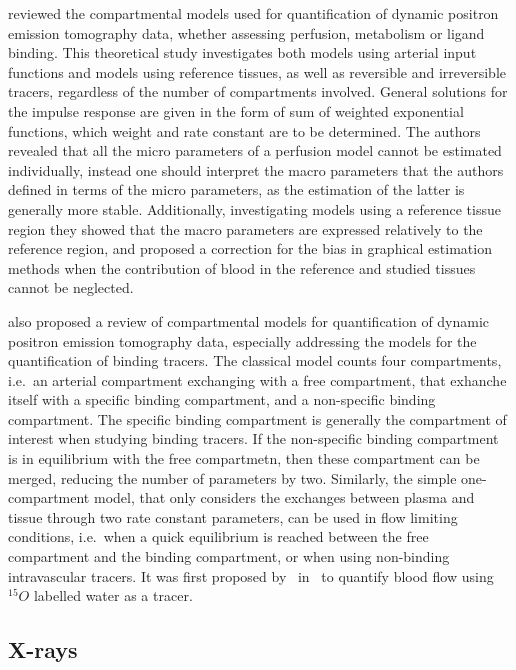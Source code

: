 \citet{Gunn:2001cx} reviewed the compartmental models used for quantification of dynamic positron emission tomography data, whether assessing perfusion, metabolism or ligand binding.
This theoretical study investigates both models using arterial input functions and models using reference tissues, as well as reversible and irreversible tracers, regardless of the number of compartments involved. 
General solutions for the impulse response are given in the form of sum of weighted exponential functions, which weight and rate constant are to be determined.
The authors revealed that all the micro parameters of a perfusion model cannot be estimated individually, instead one should interpret the macro parameters that the authors defined in terms of the micro parameters, as the estimation of the latter is generally more stable.
Additionally, investigating models using a reference tissue region they showed that the macro parameters are expressed relatively to the reference region, and proposed a correction for the bias in graphical estimation methods when the contribution of blood in the reference and studied tissues cannot be neglected.

\citet{Watabe:2006uy} also proposed a review of compartmental models for quantification of dynamic positron emission tomography data, especially addressing the models for the quantification of binding tracers.
The classical model counts four compartments, i.e.~an arterial compartment exchanging with a free compartment, that exhanche itself with a specific binding compartment, and a non-specific binding compartment.
The specific binding compartment is generally the compartment of interest when studying binding tracers.
If the non-specific binding compartment is in equilibrium with the free compartmetn, then these compartment can be merged, reducing the number of parameters by two.
Similarly, the simple one-compartment model, that only considers the exchanges between plasma and tissue through two rate constant parameters, can be used in flow limiting conditions, i.e.~when a quick equilibrium is reached between the free compartment and the binding compartment, or when using non-binding intravascular tracers.
It was first proposed by~\citet{Kety:1948je} in~\citeyear{Kety:1948je} to quantify blood flow using $^{15}O$ labelled water as a tracer.

\subsection{X-rays}

